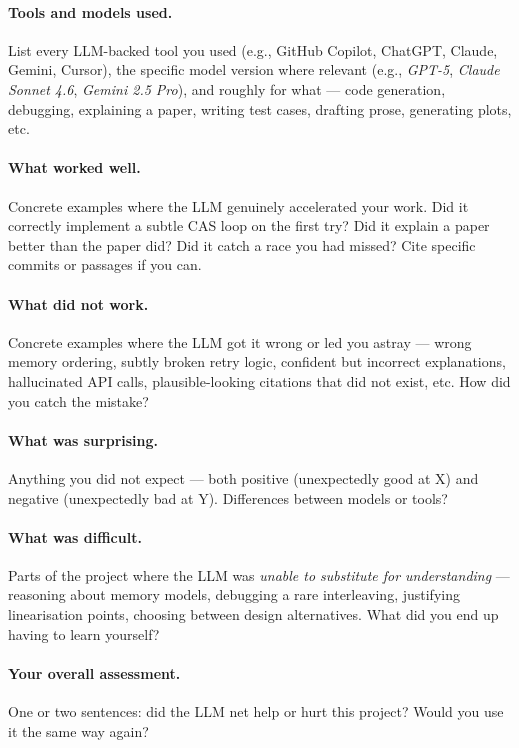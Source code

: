 \documentclass[11pt,a4paper]{article}
\begin{document}
\paragraph{Tools and models used.}
List every LLM-backed tool you used (e.g., GitHub Copilot, ChatGPT, Claude,
Gemini, Cursor), the specific model version where relevant
(e.g., \emph{GPT-5}, \emph{Claude Sonnet 4.6}, \emph{Gemini 2.5 Pro}), and
roughly for what --- code generation, debugging, explaining a paper, writing
test cases, drafting prose, generating plots, etc.

\paragraph{What worked well.}
Concrete examples where the LLM genuinely accelerated your work. Did it
correctly implement a subtle CAS loop on the first try? Did it explain a
paper better than the paper did? Did it catch a race you had missed? Cite
specific commits or passages if you can.

\paragraph{What did not work.}
Concrete examples where the LLM got it wrong or led you astray --- wrong
memory ordering, subtly broken retry logic, confident but incorrect
explanations, hallucinated API calls, plausible-looking citations that did
not exist, etc. How did you catch the mistake?

\paragraph{What was surprising.}
Anything you did not expect --- both positive (unexpectedly good at X) and
negative (unexpectedly bad at Y). Differences between models or tools?

\paragraph{What was difficult.}
Parts of the project where the LLM was \emph{unable to substitute for
understanding} --- reasoning about memory models, debugging a rare
interleaving, justifying linearisation points, choosing between design
alternatives. What did you end up having to learn yourself?

\paragraph{Your overall assessment.}
One or two sentences: did the LLM net help or hurt this project? Would you
use it the same way again?
\end{document}
